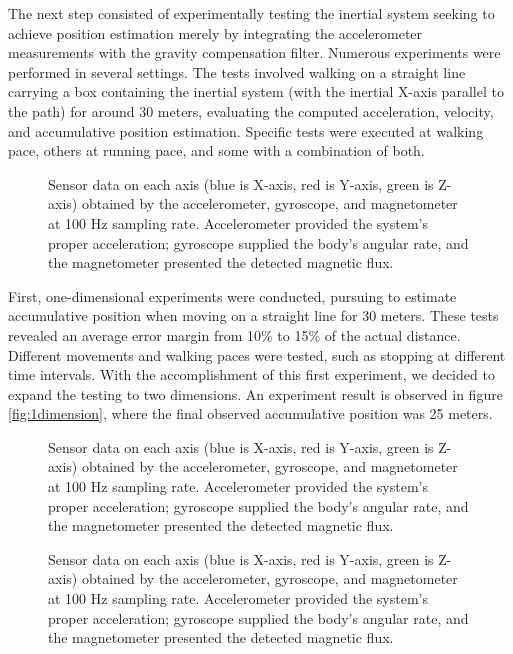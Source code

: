 The next step consisted of experimentally testing the inertial system seeking to achieve position estimation merely by integrating the accelerometer measurements with the gravity compensation filter. Numerous experiments were performed in several settings. The tests involved walking on a straight line carrying a box containing the inertial system (with the inertial X-axis parallel to the path) for around 30 meters, evaluating the computed acceleration, velocity, and accumulative position estimation. Specific tests were executed at walking pace, others at running pace, and some with a combination of both.

\begin{figure}[!h]
    \centering
    \resizebox{1\linewidth}{!}{}
    \caption{Sensor data on each axis (blue is X-axis, red is Y-axis, green is Z-axis) obtained by the accelerometer, gyroscope, and magnetometer at 100 Hz sampling rate. Accelerometer provided the system's proper acceleration; gyroscope supplied the body's angular rate, and the magnetometer presented the detected magnetic flux.}
    \label{fig:sensoroutput}
\end{figure}

First, one-dimensional experiments were conducted, pursuing to estimate accumulative position when moving on a straight line for 30 meters. These tests revealed an average error margin from 10\% to 15\% of the actual distance. Different movements and walking paces were tested, such as stopping at different time intervals. With the accomplishment of this first experiment, we decided to expand the testing to two dimensions. An experiment result is observed in figure \ref{fig:1dimension}, where the final observed accumulative position was 25 meters.

\begin{figure}
    \centering
    \resizebox{1\linewidth}{!}{}
    \caption{Sensor data on each axis (blue is X-axis, red is Y-axis, green is Z-axis) obtained by the accelerometer, gyroscope, and magnetometer at 100 Hz sampling rate. Accelerometer provided the system's proper acceleration; gyroscope supplied the body's angular rate, and the magnetometer presented the detected magnetic flux.}
    \label{fig:square}
\end{figure}

\begin{figure}
    \centering
    \resizebox{1\linewidth}{!}{}
    \caption{Sensor data on each axis (blue is X-axis, red is Y-axis, green is Z-axis) obtained by the accelerometer, gyroscope, and magnetometer at 100 Hz sampling rate. Accelerometer provided the system's proper acceleration; gyroscope supplied the body's angular rate, and the magnetometer presented the detected magnetic flux.}
    \label{fig:square}
\end{figure}

